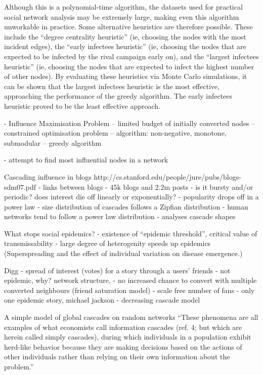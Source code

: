 Although this is a polynomial-time algorithm, the datasets used for practical social network analysis may be extremely large, making even this algorithm unworkable in practice. Some alternative heuristics are therefore possible. These include the ``degree centrality heuristic'' (ie, choosing the nodes with the most incident edges), the ``early infectees heuristic'' (ie, choosing the nodes that are expected to be infected by the rival campaign early on), and the ``largest infectees heuristic'' (ie, choosing the nodes that are expected to infect the highest number of other nodes). By evaluating these heuristics via Monte Carlo simulations, it can be shown that the largest infectees heuristic is the most effective, approaching the performance of the greedy algorithm. The early infectees heuristic proved to be the least effective approach.




- Influence Maximisation Problem
-- limited budget of initially converted nodes
-- constrained optimisation problem
-- algorithm: non-negative, monotone, submodular
-- greedy algorithm

- attempt to find most influential nodes in a network

Cascading influence in blogs
http://cs.stanford.edu/people/jure/pubs/blogs-sdm07.pdf
- links between blogs
- 45k blogs and 2.2m posts
- is it bursty and/or periodic? does interest die off linearly or exponentially?
- popularity drops off in a power law
- size distribution of cascades follows a Zipfian distribution
- human networks tend to follow a power law distribution
- analyses cascade shapes

What stops social epidemics?
- existence of ``epidemic threshold'', critical value of transmissability
- large degree of heterogenity speeds up epidemics (Superspreading and the effect of individual variation on disease emergence.)

Digg
- spread of interest (votes) for a story through a users' friends
- not epidemic, why? network structure, 
- no increased chance to convert with multiple converted neighbours (friend saturation model)
- scale free number of fans
- only one epidemic story, michael jackson
- decreasing cascade model

A simple model of global cascades on
random networks
``These phenomena are all examples of what economists call
information cascades (ref. 4; but which are herein called simply
cascades), during which individuals in a population exhibit
herd-like behavior because they are making decisions based on
the actions of other individuals rather than relying on their own
information about the problem.''

